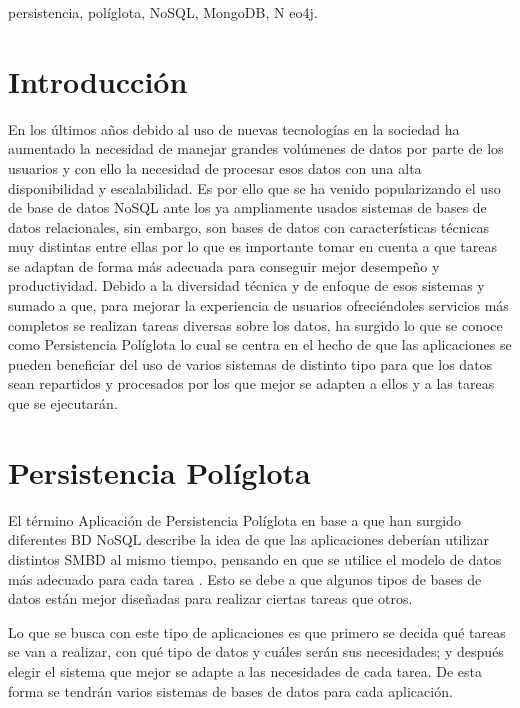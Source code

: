 \documentclass[conference]{IEEEtran}
\begin{document}
\begin{IEEEkeywords}
persistencia, pol\'iglota, NoSQL, MongoDB, N	eo4j.
\end{IEEEkeywords}


\IEEEpeerreviewmaketitle


\section{Introducci\'on}
En los \'ultimos a\~nos debido al uso de nuevas tecnolog\'ias en la sociedad  ha aumentado la necesidad de manejar grandes vol\'umenes  de datos por parte de los usuarios  y con ello la necesidad de procesar esos datos con una alta disponibilidad y escalabilidad. Es por ello que se ha venido popularizando el uso de base de datos NoSQL ante los ya ampliamente usados sistemas de bases de datos relacionales, sin embargo, son bases de datos con características t\'ecnicas muy distintas entre ellas por lo que es importante tomar en cuenta a que tareas se adaptan de forma m\'as adecuada para conseguir mejor desempe\~no y productividad. Debido a la diversidad t\'ecnica y de enfoque de esos sistemas y sumado a que, para mejorar la experiencia de usuarios ofreci\'endoles servicios m\'as completos se realizan tareas diversas sobre los datos, ha surgido lo que se conoce como Persistencia Pol\'iglota lo cual se centra en el hecho de que las aplicaciones se pueden beneficiar del uso de varios sistemas de distinto tipo para que los datos sean repartidos y procesados por los que mejor  se adapten a ellos y a las tareas que se ejecutar\'an.   


\section{Persistencia Pol\'iglota}
El t\'ermino Aplicaci\'on de Persistencia Pol\'iglota en base a que han surgido diferentes BD NoSQL describe la idea de que las aplicaciones deber\'ian utilizar distintos SMBD al mismo tiempo, pensando en que se utilice el modelo de datos m\'as adecuado para cada tarea \cite{persistenciaPoliglota}. Esto se debe a que algunos tipos de bases de datos est\'an mejor diseñadas para realizar ciertas tareas que otros.

Lo que se busca con este tipo de aplicaciones es que primero se decida qu\'e tareas se van a realizar, con qu\'e tipo de datos y cu\'ales ser\'an sus necesidades; y despu\'es elegir el sistema que mejor se adapte a las necesidades de cada tarea. De esta forma se tendr\'an varios sistemas de bases de datos para cada aplicaci\'on. 
\end{document}

